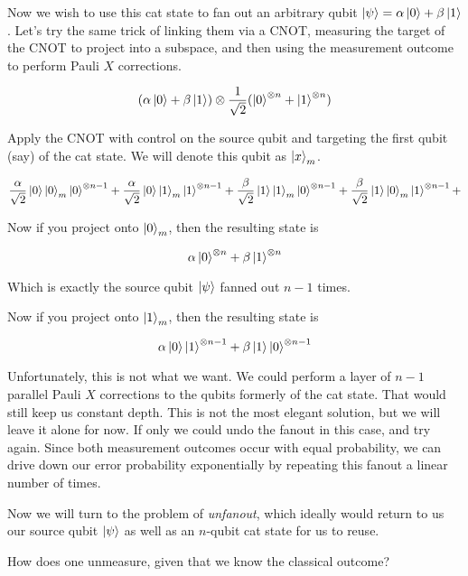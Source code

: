 \documentclass{article}
\begin{document}
Now we wish to use this cat state to fan out an arbitrary qubit
$\left\vert{\psi}\right\rangle = \alpha\left\vert{0}\right\rangle + \beta\left\vert{1}\right\rangle$. Let's try the same trick of
linking them via a CNOT, measuring the target of the CNOT to project into
a subspace, and then using the measurement outcome to perform Pauli $X$
corrections.

\begin{equation}
(\alpha\left\vert{0}\right\rangle + \beta\left\vert{1}\right\rangle)\otimes \frac{1}{\sqrt{2}}(\left\vert{0}\right\rangle^{\otimes n} + \left\vert{1}\right\rangle^{\otimes n})
\end{equation}

Apply the CNOT with control on the source qubit and targeting the first qubit
(say) of the cat state. We will denote this qubit as $\left\vert{x}\right\rangle_m$.

\begin{equation}
\frac{\alpha}{\sqrt{2}}\left\vert{0}\right\rangle\left\vert{0}\right\rangle_m\left\vert{0}\right\rangle^{\otimes n-1} + 
\frac{\alpha}{\sqrt{2}}\left\vert{0}\right\rangle\left\vert{1}\right\rangle_m\left\vert{1}\right\rangle^{\otimes n-1} + 
\frac{\beta}{\sqrt{2}}\left\vert{1}\right\rangle\left\vert{1}\right\rangle_m\left\vert{0}\right\rangle^{\otimes n-1} + 
\frac{\beta}{\sqrt{2}}\left\vert{1}\right\rangle\left\vert{0}\right\rangle_m\left\vert{1}\right\rangle^{\otimes n-1} + 
\end{equation}

Now if you project onto $\left\vert{0}\right\rangle_m$, then the resulting state is

\begin{equation}
\alpha\left\vert{0}\right\rangle^{\otimes n} + \beta\left\vert{1}\right\rangle^{\otimes n}
\end{equation}

Which is exactly the source qubit $\left\vert{\psi}\right\rangle$ fanned out $n-1$ times.

Now if you project onto $\left\vert{1}\right\rangle_m$, then the resulting state is

\begin{equation}
\alpha\left\vert{0}\right\rangle\left\vert{1}\right\rangle^{\otimes n-1} + \beta\left\vert{1}\right\rangle\left\vert{0}\right\rangle^{\otimes n-1}
\end{equation}

Unfortunately, this is not what we want. We could perform a layer of
$n-1$ parallel Pauli $X$ corrections to the qubits formerly of the cat state.
That would still keep us constant depth. This is not the most elegant
solution, but we will leave it alone for now. If only we could undo the
fanout in this case, and try again. Since both measurement outcomes
occur with equal probability, we can drive down our error probability
exponentially by repeating this fanout a linear number of times.

Now we will turn to the problem of \emph{unfanout}, which ideally would
return to us our source qubit $\left\vert{\psi}\right\rangle$ as well as an $n$-qubit cat
state for us to reuse.

How does one unmeasure, given that we know the classical outcome?
\end{document}
